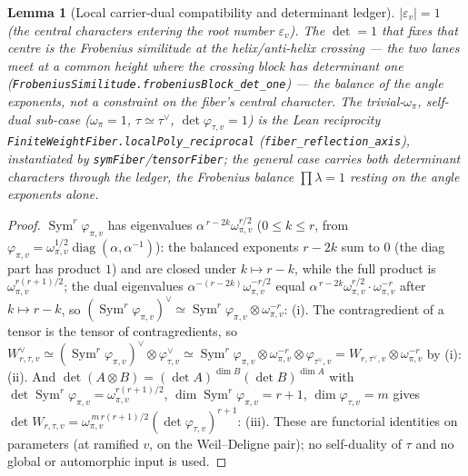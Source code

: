 \documentclass[11pt]{article}
\newtheorem{lemma}[theorem]{Lemma}
\theoremstyle{definition}
\newcommand{\Sym}{\operatorname{Sym}}
\begin{document}
\begin{lemma}[Local carrier-dual compatibility and determinant ledger]
$|\varepsilon_v|=1$ (the central characters entering the root number $\varepsilon_v$). The $\det=1$ that fixes
that centre is the \emph{Frobenius similitude at the helix/anti-helix crossing} --- the two lanes meet at a common
height where the crossing block has determinant one (\texttt{FrobeniusSimilitude.frobeniusBlock\_det\_one}) ---
the balance of the angle exponents, not a constraint on the fiber's central character. The trivial-$\omega_\pi$,
self-dual sub-case ($\omega_\pi=1$, $\tau\simeq\tau^\vee$, $\det\varphi_{\tau,v}=1$) is the Lean reciprocity
\texttt{FiniteWeightFiber.localPoly\_reciprocal} (\texttt{fiber\_reflection\_axis}), instantiated by
\texttt{symFiber}/\texttt{tensorFiber}; the general case carries both determinant characters through the ledger,
the Frobenius balance $\prod\lambda=1$ resting on the angle exponents alone.
\end{lemma}

\begin{proof}
$\Sym^r\varphi_{\pi,v}$ has eigenvalues $\alpha^{\,r-2k}\omega_{\pi,v}^{r/2}$ ($0\le k\le r$, from
$\varphi_{\pi,v}=\omega_{\pi,v}^{1/2}\operatorname{diag}(\alpha,\alpha^{-1})$): the balanced exponents $r-2k$ sum
to $0$ (the diag part has product $1$) and are closed under $k\mapsto r-k$, while the full product is
$\omega_{\pi,v}^{r(r+1)/2}$; the dual eigenvalues $\alpha^{-(r-2k)}\omega_{\pi,v}^{-r/2}$ equal
$\alpha^{\,r-2k}\omega_{\pi,v}^{r/2}\cdot\omega_{\pi,v}^{-r}$ after $k\mapsto r-k$, so
$(\Sym^r\varphi_{\pi,v})^\vee\simeq\Sym^r\varphi_{\pi,v}\otimes\omega_{\pi,v}^{-r}$: \textup{(i)}. The
contragredient of a tensor is the tensor of contragredients, so $W_{r,\tau,v}^\vee\simeq
(\Sym^r\varphi_{\pi,v})^\vee\otimes\varphi_{\tau,v}^\vee\simeq\Sym^r\varphi_{\pi,v}\otimes\omega_{\pi,v}^{-r}
\otimes\varphi_{\tau^\vee,v}=W_{r,\tau^\vee,v}\otimes\omega_{\pi,v}^{-r}$ by \textup{(i)}: \textup{(ii)}. And
$\det(A\otimes B)=(\det A)^{\dim B}(\det B)^{\dim A}$ with $\det\Sym^r\varphi_{\pi,v}=\omega_{\pi,v}^{r(r+1)/2}$,
$\dim\Sym^r\varphi_{\pi,v}=r+1$, $\dim\varphi_{\tau,v}=m$ gives
$\det W_{r,\tau,v}=\omega_{\pi,v}^{\,m\,r(r+1)/2}(\det\varphi_{\tau,v})^{r+1}$: \textup{(iii)}. These
are functorial identities on parameters (at ramified $v$, on the Weil--Deligne pair); no self-duality of
$\tau$ and no global or automorphic input is used.
\end{proof}
\end{document}
